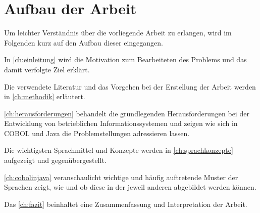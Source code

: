 \section{Aufbau der Arbeit}
Um leichter Verständnis über die vorliegende Arbeit zu erlangen, wird im Folgenden kurz auf den Aufbau dieser eingegangen.

In \autoref{ch:einleitung} wird die Motivation zum Bearbeiteten des Problems und das damit verfolgte Ziel erklärt. 

Die verwendete Literatur und das Vorgehen bei der Erstellung der Arbeit werden in \autoref{ch:methodik} erläutert.

\autoref{ch:herausforderungen} behandelt die grundlegenden Herausforderungen bei der Entwicklung von betrieblichen Informationssystemen und zeigen wie sich in COBOL und Java die Problemstellungen adressieren lassen.

Die wichtigsten Sprachmittel und Konzepte werden in \autoref{ch:sprachkonzepte} aufgezeigt und gegenübergestellt.

\autoref{ch:cobolinjava} veranschaulicht wichtige und häufig auftretende Muster der Sprachen zeigt, wie und ob diese in der jeweil anderen abgebildet werden können.

Das \autoref{ch:fazit} beinhaltet eine Zusammenfassung und Interpretation der Arbeit.